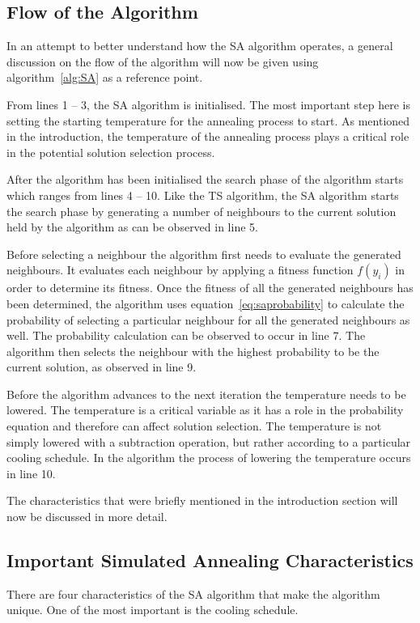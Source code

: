 \subsection{Flow of the Algorithm}
In an attempt to better understand how the SA algorithm operates, a general discussion on the flow of the algorithm will now be given using algorithm~\ref{alg:SA} as a reference point.

From lines 1 -- 3, the SA algorithm is initialised. The most important step here is setting the starting temperature for the annealing process to start. As mentioned in the introduction, the temperature of the annealing process plays a critical role in the potential solution selection process.

After the algorithm has been initialised the search phase of the algorithm starts which ranges from lines 4 -- 10. Like the TS algorithm, the SA algorithm starts the search phase by generating a number of neighbours to the current solution held by the algorithm as can be observed in line 5.

Before selecting a neighbour the algorithm first needs to evaluate the generated neighbours. It evaluates each neighbour by applying a fitness function $f(y_i)$ in order to determine its fitness.
Once the fitness of all the generated neighbours has been determined, the algorithm uses equation~\ref{eq:saprobability} to calculate the probability of selecting a particular neighbour for all the generated neighbours as well. The probability calculation can be observed to occur in line 7. The algorithm then selects the neighbour with the highest probability to be the current solution, as observed in line 9. 

Before the algorithm advances to the next iteration the temperature needs to be lowered. The temperature is a critical variable as it has a role in the probability equation and therefore can affect solution selection. The temperature is not simply lowered with a subtraction operation, but rather according to a particular cooling schedule. In the algorithm the process of lowering the temperature occurs in line 10.

The characteristics that were briefly mentioned in the introduction section will now be discussed in more detail.
\subsection{Important Simulated Annealing Characteristics}
There are four characteristics of the SA algorithm that make the algorithm unique. One of the most important is the cooling schedule. 


